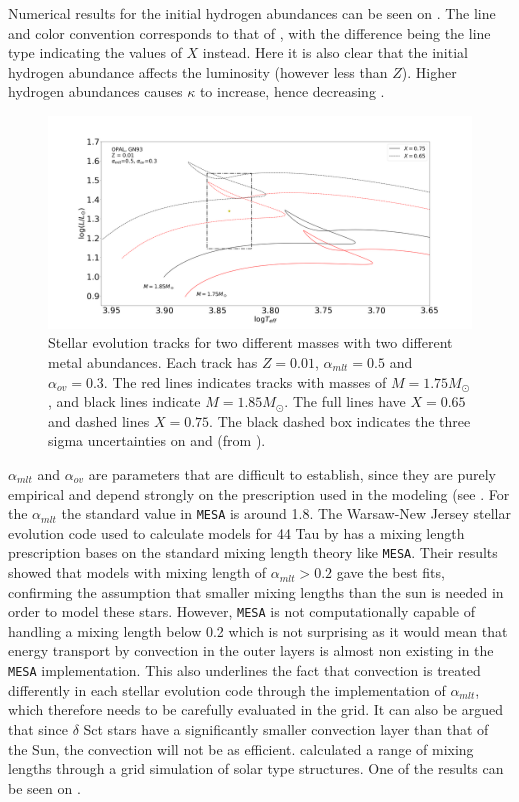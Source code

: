 Numerical results for the initial hydrogen abundances can be seen on . The line and color convention corresponds to that of , with the difference being the line type indicating the values of $X$ instead. Here it is also clear that the initial hydrogen abundance affects the luminosity (however less than $Z$). Higher hydrogen abundances causes $\kappa$ to increase, hence decreasing \lum.

\begin{figure}[htbp]
	\centering
	\includegraphics[width=1\textwidth]{test_x.png}
	\caption{Stellar evolution tracks for two different masses with two different metal abundances. Each track has $Z=0.01$, $\alpha_{mlt}=0.5$ and $\alpha_{ov}=0.3$. The red lines indicates tracks with masses of $M=1.75M_\odot$, and black lines indicate $M=1.85M_\odot$. The full lines have $X = 0.65$ and dashed lines $X = 0.75$. The black dashed box indicates the three sigma uncertainties on \lum and \teff (from \citet{lenz2010delta}).}
	\label{diffx}
\end{figure}

 $\alpha_{mlt}$ and $\alpha_{ov}$ are parameters that are difficult to establish, since they are purely empirical and depend strongly on the prescription used in the modeling (see . For the $\alpha_{mlt}$ the standard value in \texttt{MESA} is around 1.8. The Warsaw-New Jersey stellar evolution code used to calculate models for 44 Tau by \citet{lenz2010delta} has a mixing length prescription bases on the standard mixing length theory like \texttt{MESA}. Their results showed that models with mixing length of $\alpha_{mlt} > 0.2$ gave the best fits, confirming the assumption that smaller mixing lengths than the sun is needed in order to model these stars. However, \texttt{MESA} is not computationally capable of handling a mixing length below 0.2 which is not surprising as it would mean that energy transport by convection in the outer layers is almost non existing in the  \texttt{MESA} implementation. This also underlines the fact that convection is treated differently in each stellar evolution code through the implementation of $\alpha_{mlt}$, which therefore needs to be carefully evaluated in the grid. It can also be argued that since $\delta$ Sct stars have a significantly smaller convection layer than that of the Sun, the convection will not be as efficient.  \citet{trampedach2011mass} calculated a range of mixing lengths through a grid simulation of solar type structures. One of the results can be seen on . 

